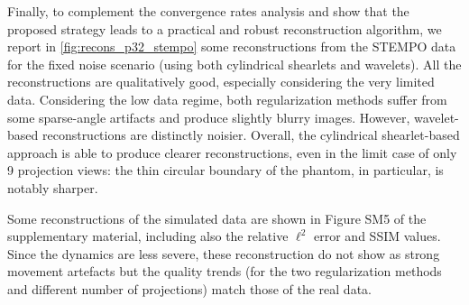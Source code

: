 \documentclass[11pt,a4paper]{article}
\numberwithin{equation}{section}
\begin{document}
Finally, to complement the convergence rates analysis and show that the proposed strategy leads to a practical and robust reconstruction algorithm, we report in \cref{fig:recons_p32_stempo} some reconstructions from the STEMPO data for the fixed noise scenario 
(using both cylindrical shearlets and wavelets). 
All the reconstructions are qualitatively good, especially considering the very limited data. Considering the low data regime, both regularization methods suffer from some sparse-angle artifacts and produce slightly blurry images. However, wavelet-based reconstructions are distinctly noisier. Overall, the cylindrical shearlet-based approach is able to produce clearer reconstructions, even in the limit case of only 9 projection views: the thin circular boundary of the phantom, in particular, is notably sharper. 

Some reconstructions of the simulated data are shown in Figure SM5 %
of the supplementary material, including also the relative $\ell^2$ error and SSIM \cite{wang2004image} values. Since the dynamics are less severe, these reconstruction do not show as strong movement artefacts but the quality trends (for the two regularization methods and different number of projections) match those of the real data.
\end{document}
